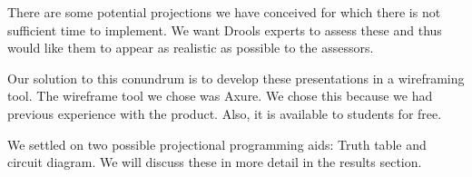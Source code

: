 There are some potential projections we have conceived for which there is not sufficient time to implement.
We want Drools experts to assess these and thus would like them to appear as realistic as possible to the assessors.

Our solution to this conundrum is to develop these presentations in a wireframing tool.
The wireframe tool we chose was Axure\cite{Axure_ProductPage}.
We chose this because we had previous experience with the product.
Also, it is available to students for free.

We settled on two possible projectional programming aids: Truth table and circuit diagram.
We will discuss these in more detail in the results section.
